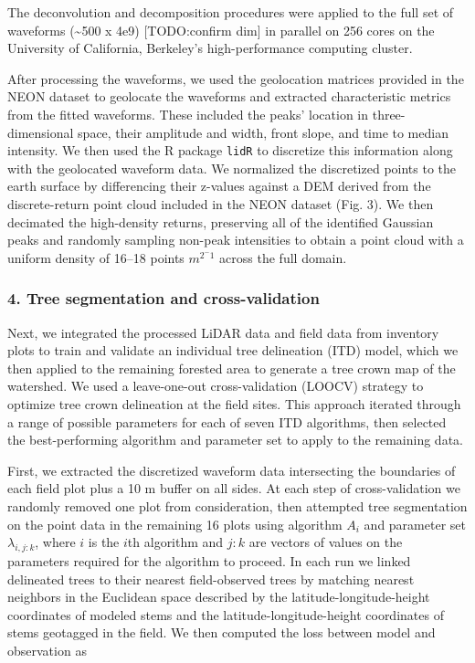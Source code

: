 \documentclass[
  12pt,
]{article}
\begin{document}
The deconvolution and decomposition procedures were applied to the full
set of waveforms (\textasciitilde500 x 4e9) {[}TODO:confirm dim{]} in
parallel on 256 cores on the University of California, Berkeley's
high-performance computing cluster.

After processing the waveforms, we used the geolocation matrices
provided in the NEON dataset to geolocate the waveforms and extracted
characteristic metrics from the fitted waveforms. These included the
peaks' location in three-dimensional space, their amplitude and width,
front slope, and time to median intensity. We then used the R package
\texttt{lidR} to discretize this information along with the geolocated
waveform data. We normalized the discretized points to the earth surface
by differencing their z-values against a DEM derived from the
discrete-return point cloud included in the NEON dataset (Fig. 3). We
then decimated the high-density returns, preserving all of the
identified Gaussian peaks and randomly sampling non-peak intensities to
obtain a point cloud with a uniform density of 16--18 points
\(m^{2^-1}\) across the full domain.

\hypertarget{tree-segmentation-and-cross-validation}{%
\subsubsection{4. Tree segmentation and
cross-validation}\label{tree-segmentation-and-cross-validation}}

Next, we integrated the processed LiDAR data and field data from
inventory plots to train and validate an individual tree delineation
(ITD) model, which we then applied to the remaining forested area to
generate a tree crown map of the watershed. We used a leave-one-out
cross-validation (LOOCV) strategy to optimize tree crown delineation at
the field sites. This approach iterated through a range of possible
parameters for each of seven ITD algorithms, then selected the
best-performing algorithm and parameter set to apply to the remaining
data.

First, we extracted the discretized waveform data intersecting the
boundaries of each field plot plus a 10 m buffer on all sides. At each
step of cross-validation we randomly removed one plot from
consideration, then attempted tree segmentation on the point data in the
remaining 16 plots using algorithm \(A_i\) and parameter set
\(\lambda_{i,j:k}\), where \(i\) is the \(i\)th algorithm and \(j:k\)
are vectors of values on the parameters required for the algorithm to
proceed. In each run we linked delineated trees to their nearest
field-observed trees by matching nearest neighbors in the Euclidean
space described by the latitude-longitude-height coordinates of modeled
stems and the latitude-longitude-height coordinates of stems geotagged
in the field. We then computed the loss between model and observation as
\end{document}
